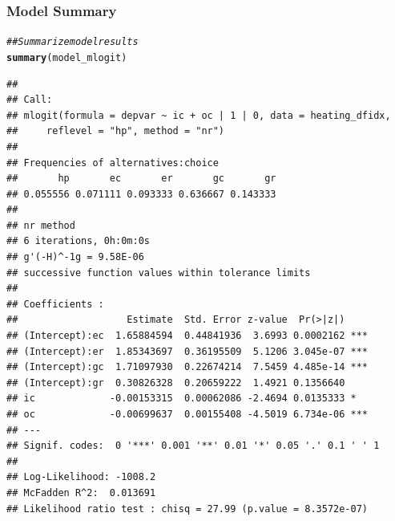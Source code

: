 \documentclass{beamer}\usepackage[]{graphicx}\usepackage[]{xcolor}
\makeatletter
\newcommand{\hlcom}[1]{\textcolor[rgb]{0.678,0.584,0.686}{\textit{#1}}}%
\newcommand{\hlstd}[1]{\textcolor[rgb]{0.345,0.345,0.345}{#1}}%
\newcommand{\hlkwd}[1]{\textcolor[rgb]{0.737,0.353,0.396}{\textbf{#1}}}%
\newenvironment{kframe}{%
 \def\at@end@of@kframe{}%
 \ifinner\ifhmode%
  \def\at@end@of@kframe{\end{minipage}}%
  \begin{minipage}{\columnwidth}%
 \fi\fi%
 \def\FrameCommand##1{\hskip\@totalleftmargin \hskip-\fboxsep
 \colorbox{shadecolor}{##1}\hskip-\fboxsep
     \hskip-\linewidth \hskip-\@totalleftmargin \hskip\columnwidth}%
 \MakeFramed {\advance\hsize-\width
   \@totalleftmargin\z@ \linewidth\hsize
   \@setminipage}}%
 {\par\unskip\endMakeFramed%
 \at@end@of@kframe}
\newenvironment{knitrout}{}{} %
\makeatother
\begin{document}
\begin{frame}[fragile]\frametitle{Model Summary}
\begin{knitrout}\tiny
{}\color{fgcolor}\begin{kframe}
\begin{alltt}
\hlcom{## Summarize model results}
\hlkwd{summary}\hlstd{(model_mlogit)}
\end{alltt}
\begin{verbatim}
## 
## Call:
## mlogit(formula = depvar ~ ic + oc | 1 | 0, data = heating_dfidx, 
##     reflevel = "hp", method = "nr")
## 
## Frequencies of alternatives:choice
##       hp       ec       er       gc       gr 
## 0.055556 0.071111 0.093333 0.636667 0.143333 
## 
## nr method
## 6 iterations, 0h:0m:0s 
## g'(-H)^-1g = 9.58E-06 
## successive function values within tolerance limits 
## 
## Coefficients :
##                   Estimate  Std. Error z-value  Pr(>|z|)    
## (Intercept):ec  1.65884594  0.44841936  3.6993 0.0002162 ***
## (Intercept):er  1.85343697  0.36195509  5.1206 3.045e-07 ***
## (Intercept):gc  1.71097930  0.22674214  7.5459 4.485e-14 ***
## (Intercept):gr  0.30826328  0.20659222  1.4921 0.1356640    
## ic             -0.00153315  0.00062086 -2.4694 0.0135333 *  
## oc             -0.00699637  0.00155408 -4.5019 6.734e-06 ***
## ---
## Signif. codes:  0 '***' 0.001 '**' 0.01 '*' 0.05 '.' 0.1 ' ' 1
## 
## Log-Likelihood: -1008.2
## McFadden R^2:  0.013691 
## Likelihood ratio test : chisq = 27.99 (p.value = 8.3572e-07)
\end{verbatim}
\end{kframe}
\end{knitrout}
\end{frame}
\end{document}
